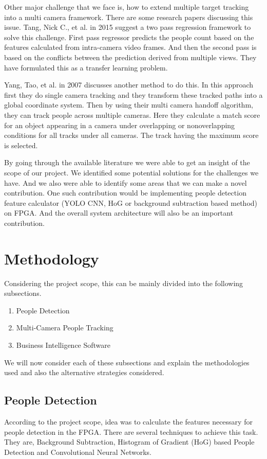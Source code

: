 \documentclass[12pt,a4paper]{report}
\begin{document}
\par Other major challenge that we face is, how to extend multiple target tracking into a multi camera framework. There are some research papers discussing this issue. Tang, Nick C., et al. \cite{6} in 2015 suggest a two pass regression framework to solve this challenge. First pass regressor predicts the people count based on the features calculated from intra-camera video frames. And then the second pass is based on the conflicts between the prediction derived from multiple views. They have formulated this as a transfer learning problem.

\par Yang, Tao, et al. \cite{7} in 2007 discusses another method to do this. In this approach first they do single camera tracking and they transform these tracked paths into a global coordinate system. Then by using their multi camera handoff algorithm, they can track people across multiple cameras. Here they calculate a match score for an object appearing in a camera under overlapping or nonoverlapping conditions for all tracks under all cameras. The track having the maximum score is selected.

\par By going through the available literature we were able to get an insight of the scope of our project. We identified some potential solutions for the challenges we have. And we also were able to identify some areas that we can make a novel contribution. One such contribution would be implementing people detection feature calculator (YOLO\cite{4} CNN, HoG or background subtraction based method) on FPGA. And the overall system architecture will also be an important contribution.

\chapter{Methodology}
Considering the project scope, this can be mainly divided into the following subsections. 
\begin{enumerate}
\item People Detection
\item Multi-Camera People Tracking
\item Business Intelligence Software
\end{enumerate}
 We will now consider each of these subsections and explain the methodologies used and also the alternative strategies considered.
\section{People Detection}
According to the project scope, idea was to calculate the features necessary for people detection in the FPGA. There are several techniques to achieve this task. They are, Background Subtraction, Histogram of Gradient (HoG) based People Detection and Convolutional Neural Networks.
\end{document}
